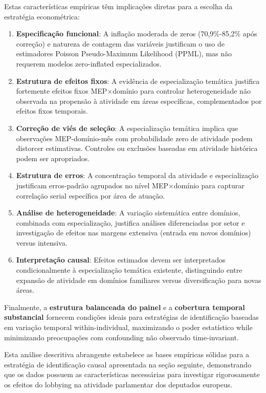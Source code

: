 Estas características empíricas têm implicações diretas para a escolha da estratégia econométrica:

\begin{enumerate}
    \item \textbf{Especificação funcional}: A inflação moderada de zeros (70,9\%-85,2\% após correção) e natureza de contagem das variáveis justificam o uso de estimadores Poisson Pseudo-Maximum Likelihood (PPML), mas não requerem modelos zero-inflated especializados.
    
    \item \textbf{Estrutura de efeitos fixos}: A evidência de especialização temática justifica fortemente efeitos fixos MEP×domínio para controlar heterogeneidade não observada na propensão à atividade em áreas específicas, complementados por efeitos fixos temporais.
    
    \item \textbf{Correção de viés de seleção}: A especialização temática implica que observações MEP-domínio-mês com probabilidade zero de atividade podem distorcer estimativas. Controles ou exclusões baseadas em atividade histórica podem ser apropriados.
    
    \item \textbf{Estrutura de erros}: A concentração temporal da atividade e especialização justificam erros-padrão agrupados no nível MEP×domínio para capturar correlação serial específica por área de atuação.
    
    \item \textbf{Análise de heterogeneidade}: A variação sistemática entre domínios, combinada com especialização, justifica análises diferenciadas por setor e investigação de efeitos nas margens extensiva (entrada em novos domínios) versus intensiva.
    
    \item \textbf{Interpretação causal}: Efeitos estimados devem ser interpretados condicionalmente à especialização temática existente, distinguindo entre expansão de atividade em domínios familiares versus diversificação para novas áreas.
\end{enumerate}

Finalmente, a \textbf{estrutura balanceada do painel} e a \textbf{cobertura temporal substancial} fornecem condições ideais para estratégias de identificação baseadas em variação temporal within-individual, maximizando o poder estatístico while minimizando preocupações com confounding não observado time-invariant.

Esta análise descritiva abrangente estabelece as bases empíricas sólidas para a estratégia de identificação causal apresentada na seção seguinte, demonstrando que os dados possuem as características necessárias para investigar rigorosamente os efeitos do lobbying na atividade parlamentar dos deputados europeus.
